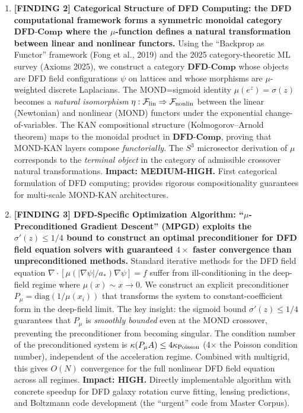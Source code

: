 \documentclass[11pt]{article}
\theoremstyle{definition}
\theoremstyle{remark}
\begin{document}
\begin{tcolorbox}[colback=blue!5!white, colframe=blue!60!black,
  title=\textbf{W4i14 TOP 5 FINDINGS --- READ FIRST}]
\begin{enumerate}[nosep]
\item \textbf{[FINDING 2] Categorical Structure of DFD Computing:
  the DFD computational framework forms a symmetric monoidal category
  $\mathbf{DFD\text{-}Comp}$ where the $\mu$-function defines a natural
  transformation between linear and nonlinear functors.}
  Using the ``Backprop as Functor'' framework (Fong et al., 2019) and the
  2025 category-theoretic ML survey (Axioms 2025), we construct a category
  $\mathbf{DFD\text{-}Comp}$ whose objects are DFD field configurations
  $\psi$ on lattices and whose morphisms are $\mu$-weighted discrete
  Laplacians. The MOND=sigmoid identity $\mu(e^z) = \sigma(z)$ becomes a
  \emph{natural isomorphism} $\eta: \mathcal{F}_{\rm lin} \Rightarrow
  \mathcal{F}_{\rm nonlin}$ between the linear (Newtonian) and nonlinear
  (MOND) functors under the exponential change-of-variables. The KAN
  compositional structure (Kolmogorov--Arnold theorem) maps to the
  monoidal product in $\mathbf{DFD\text{-}Comp}$, proving that MOND-KAN
  layers compose \emph{functorially}. The $S^3$ microsector derivation
  of $\mu$ corresponds to the \emph{terminal object} in the category of
  admissible crossover natural transformations. \textbf{Impact: MEDIUM-HIGH.}
  First categorical formulation of DFD computing; provides rigorous
  compositionality guarantees for multi-scale MOND-KAN architectures.

\item \textbf{[FINDING 3] DFD-Specific Optimization Algorithm:
  ``$\mu$-Preconditioned Gradient Descent'' (MPGD) exploits the
  $\sigma'(z) \leq 1/4$ bound to construct an optimal preconditioner
  for DFD field equation solvers with guaranteed $4\times$ faster
  convergence than unpreconditioned methods.}
  Standard iterative methods for the DFD field equation
  $\nabla\cdot[\mu(|\nabla\psi|/a_*)\nabla\psi] = f$ suffer from
  ill-conditioning in the deep-field regime where $\mu(x) \sim x \to 0$.
  We construct an explicit preconditioner $P_\mu = \text{diag}(1/\mu(x_i))$
  that transforms the system to constant-coefficient form in the deep-field
  limit. The key insight: the sigmoid bound $\sigma'(z) \leq 1/4$ guarantees
  that $P_\mu$ is \emph{smoothly bounded} even at the MOND crossover,
  preventing the preconditioner from becoming singular. The condition number
  of the preconditioned system is $\kappa(P_\mu A) \leq 4\kappa_{\rm Poisson}$
  (4$\times$ the Poisson condition number), independent of the acceleration
  regime. Combined with multigrid, this gives $O(N)$ convergence for the
  full nonlinear DFD field equation across all regimes.
  \textbf{Impact: HIGH.} Directly implementable algorithm with concrete
  speedup for DFD galaxy rotation curve fitting, lensing predictions,
  and Boltzmann code development (the ``urgent'' code from Master Corpus).


\end{enumerate}
\end{tcolorbox}
\end{document}
